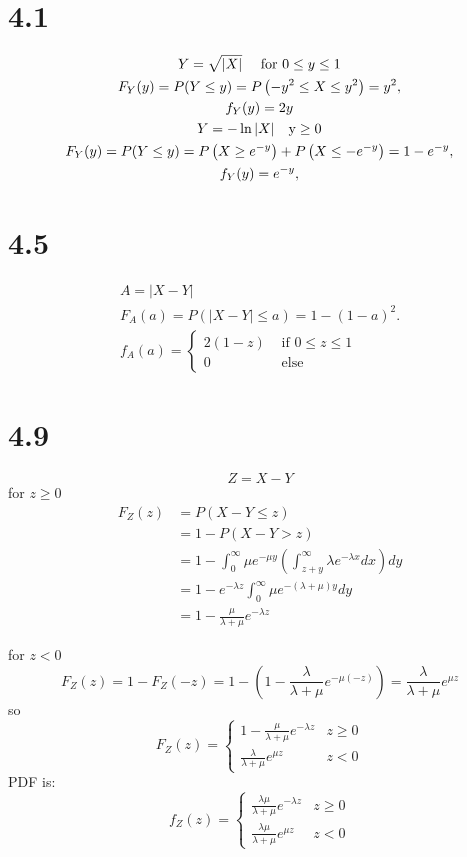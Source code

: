 \documentclass{article}
\begin{document}
		
	\section*{4.1}
		$$
		\begin{gathered}
		Y=\sqrt{|X|} \quad \text { for } 0 \leq y \leq 1 \\
		F_{Y}(y)=P(Y \leq y)=P\left(-y^{2} \leq X \leq y^{2}\right)=y^{2}, \\
		f_{Y}(y)=2 y  \\
		Y=-\ln |X| \quad \text  y \geq 0\\
		F_{Y}(y)=P(Y \leq y)=P\left(X \geq e^{-y}\right)+P\left(X \leq-e^{-y}\right)=1-e^{-y}, \\
		f_{Y}(y)=e^{-y} ,
		\end{gathered}
		$$

	\section*{4.5}
		$$
		\begin{gathered}
		A=|X-Y| \\
		F_{A}(a)=P(|X-Y| \leq a)=1-(1-a)^{2} . \\
		f_{A}(a)= \begin{cases}2(1-z) & \text { if } 0 \leq z \leq 1 \\
		0 & \text { else }\end{cases}
		\end{gathered}
		$$


	
	\section*{4.9}
		$$
		Z=X-Y
		$$
		for $z \geq 0$
		$$
		\begin{aligned}
		F_{Z}(z) &=P(X-Y \leq z) \\
		&=1-P(X-Y>z) \\
		&=1-\int_{0}^{\infty} \mu e^{-\mu y}\left(\int_{z+y}^{\infty} \lambda e^{-\lambda x} d x\right) d y \\
		&=1-e^{-\lambda z} \int_{0}^{\infty} \mu e^{-(\lambda+\mu) y} d y \\
		&=1-\frac{\mu}{\lambda+\mu} e^{-\lambda z}
		\end{aligned}
		$$
		
		for $z<0$
		$$
		F_{Z}(z)=1-F_{Z}(-z)=1-\left(1-\frac{\lambda}{\lambda+\mu} e^{-\mu(-z)}\right)=\frac{\lambda}{\lambda+\mu} e^{\mu z}
		$$
		so
		$$
		F_{Z}(z)= \begin{cases}1-\frac{\mu}{\lambda+\mu} e^{-\lambda z}& z \geq 0 \\ \frac{\lambda}{\lambda+\mu} e^{\mu z} &z<0\end{cases}
		$$
		PDF is:
		$$
		f_{Z}(z)= \begin{cases}\frac{\lambda \mu}{\lambda+\mu} e^{-\lambda z} & z \geq 0 \\ \frac{\lambda \mu}{\lambda+\mu} e^{\mu z} & z<0\end{cases}
		$$
\end{document}
